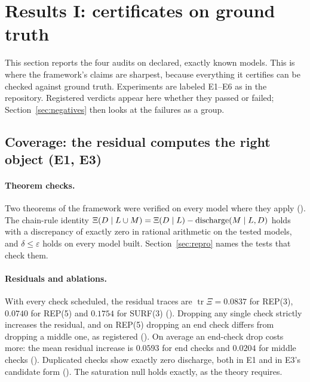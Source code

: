\section{Results I: certificates on ground truth}
\label{sec:results-certificates}

This section reports the four audits on declared, exactly known models. This is where the framework's claims are sharpest, because everything it certifies can be checked against ground truth. Experiments are labeled E1--E6 as in the repository. Registered verdicts appear here whether they passed or failed; Section~\ref{sec:negatives} then looks at the failures as a group.

\subsection{Coverage: the residual computes the right object (E1, E3)}
\label{sec:results-coverage}

\paragraph{Theorem checks.} Two theorems of the framework were verified on every model where they apply (\gTheorem). The chain-rule identity $\Xi(D \mid L \cup M) = \Xi(D \mid L) - \mathrm{discharge}(M \mid L, D)$ holds with a discrepancy of exactly zero in rational arithmetic on the tested models, and $\delta \le \varepsilon$ holds on every model built. Section~\ref{sec:repro} names the tests that check them. %

\paragraph{Residuals and ablations.} With every check scheduled, the residual traces are $\operatorname{tr}\Xi = 0.0837$ for REP(3), $0.0740$ for REP(5) and $0.1754$ for SURF(3) (\gExact). %
Dropping any single check strictly increases the residual, and on REP(5) dropping an end check differs from dropping a middle one, as registered (\gRegPos). %
On average an end-check drop costs more: the mean residual increase is $0.0593$ for end checks and $0.0204$ for middle checks (\gExact). %
Duplicated checks show exactly zero discharge, both in E1 and in E3's candidate form (\gRegPos). The saturation null holds exactly, as the theory requires. %


